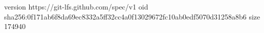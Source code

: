 version https://git-lfs.github.com/spec/v1
oid sha256:0f171ab6f8da69ec8332a5ff32cc4a0f13029672fc10ab0edf5070d31258a8b6
size 174940
